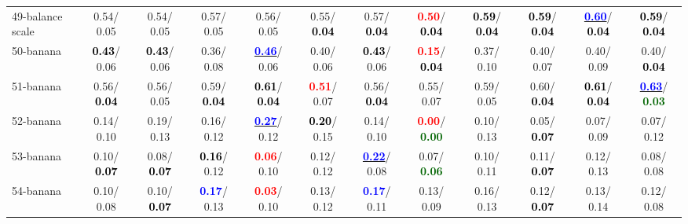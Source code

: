 \begin{table}[h]
\begin{center}
{\begin{tabular}{lc|c|c|c|c|c|c|c|c|c|c}
49-balance scale &   0.54/  0.05 &   0.54/  0.05 &   0.57/  0.05 &   0.56/  0.05 &   0.55/\textcolor{black}{\textbf{  0.04}} &   0.57/\textcolor{black}{\textbf{  0.04}} & \textcolor{red}{\textbf{  0.50}}/\textcolor{black}{\textbf{  0.04}} & \textcolor{black}{\textbf{  0.59}}/\textcolor{black}{\textbf{  0.04}} & \textcolor{black}{\textbf{  0.59}}/\textcolor{black}{\textbf{  0.04}} & \underline{\textcolor{blue}{\textbf{  0.60}}}/\textcolor{black}{\textbf{  0.04}} & \textcolor{black}{\textbf{  0.59}}/\textcolor{black}{\textbf{  0.04}} \\
50-banana & \textcolor{black}{\textbf{  0.43}}/  0.06 & \textcolor{black}{\textbf{  0.43}}/  0.06 &   0.36/  0.08 & \underline{\textcolor{blue}{\textbf{  0.46}}}/  0.06 &   0.40/  0.06 & \textcolor{black}{\textbf{  0.43}}/  0.06 & \textcolor{red}{\textbf{  0.15}}/\textcolor{black}{\textbf{  0.04}} &   0.37/  0.10 &   0.40/  0.07 &   0.40/  0.09 &   0.40/\textcolor{black}{\textbf{  0.04}} \\
51-banana &   0.56/\textcolor{black}{\textbf{  0.04}} &   0.56/  0.05 &   0.59/\textcolor{black}{\textbf{  0.04}} & \textcolor{black}{\textbf{  0.61}}/\textcolor{black}{\textbf{  0.04}} & \textcolor{red}{\textbf{  0.51}}/  0.07 &   0.56/\textcolor{black}{\textbf{  0.04}} &   0.55/  0.07 &   0.59/  0.05 &   0.60/\textcolor{black}{\textbf{  0.04}} & \textcolor{black}{\textbf{  0.61}}/\textcolor{black}{\textbf{  0.04}} & \underline{\textcolor{blue}{\textbf{  0.63}}}/\textcolor{darkgreen}{\textbf{  0.03}} \\
52-banana &   0.14/  0.10 &   0.19/  0.13 &   0.16/  0.12 & \underline{\textcolor{blue}{\textbf{  0.27}}}/  0.12 & \textcolor{black}{\textbf{  0.20}}/  0.15 &   0.14/  0.10 & \textcolor{red}{\textbf{  0.00}}/\textcolor{darkgreen}{\textbf{  0.00}} &   0.10/  0.13 &   0.05/\textcolor{black}{\textbf{  0.07}} &   0.07/  0.09 &   0.07/  0.12 \\
53-banana &   0.10/\textcolor{black}{\textbf{  0.07}} &   0.08/\textcolor{black}{\textbf{  0.07}} & \textcolor{black}{\textbf{  0.16}}/  0.12 & \textcolor{red}{\textbf{  0.06}}/  0.10 &   0.12/  0.12 & \underline{\textcolor{blue}{\textbf{  0.22}}}/  0.08 &   0.07/\textcolor{darkgreen}{\textbf{  0.06}} &   0.10/  0.11 &   0.11/\textcolor{black}{\textbf{  0.07}} &   0.12/  0.13 &   0.08/  0.08 \\ \hline
54-banana &   0.10/  0.08 &   0.10/\textcolor{black}{\textbf{  0.07}} & \textcolor{blue}{\textbf{  0.17}}/  0.13 & \textcolor{red}{\textbf{  0.03}}/  0.10 &   0.13/  0.12 & \textcolor{blue}{\textbf{  0.17}}/  0.11 &   0.13/  0.09 &   0.16/  0.13 &   0.12/\textcolor{black}{\textbf{  0.07}} &   0.13/  0.14 &   0.12/  0.08 \\

\end{tabular}}
\end{center}
\end{table}
